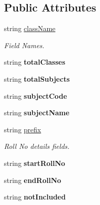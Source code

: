 \subsection*{Public Attributes}
\begin{DoxyCompactItemize}
\item 
string \hyperlink{classInputFieldNames_a171ac43b7f0c5b5ab9fad8f3417dfb5c}{class\-Name}
\begin{DoxyCompactList}\small\item\em Field Names. \end{DoxyCompactList}\item 
\hypertarget{classInputFieldNames_a7bb8018d71f6ce48a5d25500df3c0335}{string {\bfseries total\-Classes}}\label{classInputFieldNames_a7bb8018d71f6ce48a5d25500df3c0335}

\item 
\hypertarget{classInputFieldNames_a301643eaa424566636e295cb8a8e63ef}{string {\bfseries total\-Subjects}}\label{classInputFieldNames_a301643eaa424566636e295cb8a8e63ef}

\item 
\hypertarget{classInputFieldNames_a597ee6c7a7de187df580546bd09d6289}{string {\bfseries subject\-Code}}\label{classInputFieldNames_a597ee6c7a7de187df580546bd09d6289}

\item 
\hypertarget{classInputFieldNames_a4d589fac2a65e2ebbdf5fed5a38929b1}{string {\bfseries subject\-Name}}\label{classInputFieldNames_a4d589fac2a65e2ebbdf5fed5a38929b1}

\item 
string \hyperlink{classInputFieldNames_a6b73b0278aac9c72ce168717674261c7}{prefix}
\begin{DoxyCompactList}\small\item\em Roll No details fields. \end{DoxyCompactList}\item 
\hypertarget{classInputFieldNames_a55492c5cc6af276ae73e3e4e3e2f0434}{string {\bfseries start\-Roll\-No}}\label{classInputFieldNames_a55492c5cc6af276ae73e3e4e3e2f0434}

\item 
\hypertarget{classInputFieldNames_a78cb711d50ce1ab6e97beb37f9069485}{string {\bfseries end\-Roll\-No}}\label{classInputFieldNames_a78cb711d50ce1ab6e97beb37f9069485}

\item 
\hypertarget{classInputFieldNames_a3f2d3c779501727ba335d88f5edf2060}{string {\bfseries not\-Included}}\label{classInputFieldNames_a3f2d3c779501727ba335d88f5edf2060}

\end{DoxyCompactItemize}


